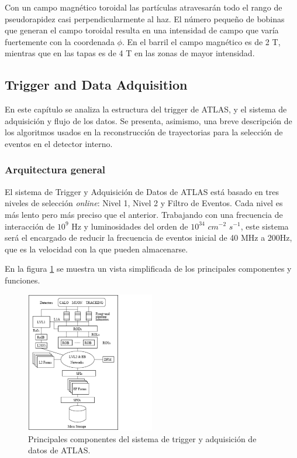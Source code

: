    Con un campo magn\'etico toroidal las part\'iculas atravesar\'an todo el rango de pseudorapidez casi perpendicularmente al haz. El n\'umero peque\~no de bobinas que generan el campo toroidal resulta en una intensidad de campo que var\'ia fuertemente con la coordenada $\phi$. En el barril el campo magn\'etico es de 2 T, mientras que en las tapas es de 4 T en las zonas de mayor intensidad.   



\subsection{Trigger and Data Adquisition}\label{sec:atlasCALO}
 En este cap\'itulo se analiza la estructura del trigger de ATLAS, y el sistema de adquisici\'on y flujo de los datos. Se presenta, asimismo, una breve descripci\'on de los algoritmos usados en la reconstrucci\'on de trayectorias para la selecci\'on de eventos en el detector interno. 


\subsubsection{Arquitectura general}

   El sistema de Trigger y Adquisici\'on de Datos\cite{TDRtdaq} de ATLAS est\'a basado en tres niveles de selecci\'on \emph{online}: Nivel 1, Nivel 2 y Filtro de Eventos. Cada nivel es m\'as lento pero m\'as preciso que el anterior. Trabajando con una frecuencia de interacci\'on de $10^{9}$ Hz y luminosidades del orden de $10^{34}$ $cm^{-2}$ $s^{-1}$, este sistema ser\'a el encargado de reducir la frecuencia de eventos inicial de 40 MHz a 200Hz, que es la velocidad con la que pueden almacenarse. 

   En la figura \ref{fig:TDAQ} se muestra un vista simplificada de los principales componentes y funciones.  

\begin{figure}[!h]
\begin{center}
\includegraphics[width=0.5\textwidth]{Fig3/paint_TDAQ.pdf}
\caption{Principales componentes del sistema de trigger y adquisici\'on de datos de ATLAS. } 
\label{fig:TDAQ}
\end{center}
\end{figure}

